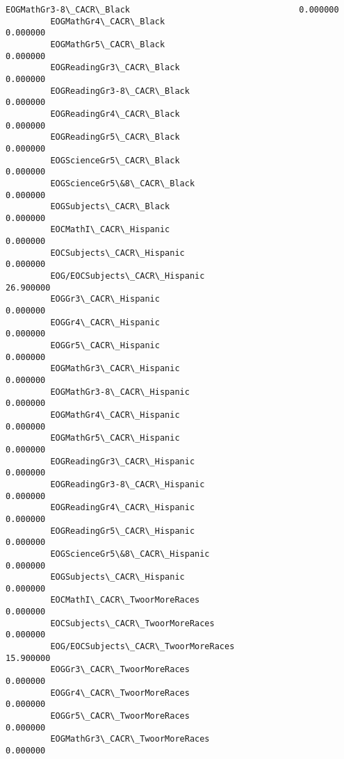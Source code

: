 \documentclass[11pt]{article}
\begin{document}
\begin{Verbatim}[commandchars=\\\{\}]
         EOGMathGr3-8\_CACR\_Black                                  0.000000   
         EOGMathGr4\_CACR\_Black                                    0.000000   
         EOGMathGr5\_CACR\_Black                                    0.000000   
         EOGReadingGr3\_CACR\_Black                                 0.000000   
         EOGReadingGr3-8\_CACR\_Black                               0.000000   
         EOGReadingGr4\_CACR\_Black                                 0.000000   
         EOGReadingGr5\_CACR\_Black                                 0.000000   
         EOGScienceGr5\_CACR\_Black                                 0.000000   
         EOGScienceGr5\&8\_CACR\_Black                               0.000000   
         EOGSubjects\_CACR\_Black                                   0.000000   
         EOCMathI\_CACR\_Hispanic                                   0.000000   
         EOCSubjects\_CACR\_Hispanic                                0.000000   
         EOG/EOCSubjects\_CACR\_Hispanic                           26.900000   
         EOGGr3\_CACR\_Hispanic                                     0.000000   
         EOGGr4\_CACR\_Hispanic                                     0.000000   
         EOGGr5\_CACR\_Hispanic                                     0.000000   
         EOGMathGr3\_CACR\_Hispanic                                 0.000000   
         EOGMathGr3-8\_CACR\_Hispanic                               0.000000   
         EOGMathGr4\_CACR\_Hispanic                                 0.000000   
         EOGMathGr5\_CACR\_Hispanic                                 0.000000   
         EOGReadingGr3\_CACR\_Hispanic                              0.000000   
         EOGReadingGr3-8\_CACR\_Hispanic                            0.000000   
         EOGReadingGr4\_CACR\_Hispanic                              0.000000   
         EOGReadingGr5\_CACR\_Hispanic                              0.000000   
         EOGScienceGr5\&8\_CACR\_Hispanic                            0.000000   
         EOGSubjects\_CACR\_Hispanic                                0.000000   
         EOCMathI\_CACR\_TwoorMoreRaces                             0.000000   
         EOCSubjects\_CACR\_TwoorMoreRaces                          0.000000   
         EOG/EOCSubjects\_CACR\_TwoorMoreRaces                     15.900000   
         EOGGr3\_CACR\_TwoorMoreRaces                               0.000000   
         EOGGr4\_CACR\_TwoorMoreRaces                               0.000000   
         EOGGr5\_CACR\_TwoorMoreRaces                               0.000000   
         EOGMathGr3\_CACR\_TwoorMoreRaces                           0.000000   

\end{Verbatim}
\end{document}
